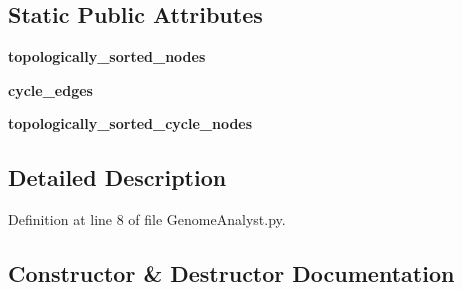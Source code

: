 \subsection*{Static Public Attributes}
\begin{DoxyCompactItemize}
\item 
{\bfseries topologically\+\_\+sorted\+\_\+nodes}\hypertarget{class_n_e_a_t___py_genetics_1_1_n_e_a_t_1_1_analyst_1_1_genome_analyst_1_1_genome_analyst_a61333814f998f2c80d271f3ebc92d198}{}\label{class_n_e_a_t___py_genetics_1_1_n_e_a_t_1_1_analyst_1_1_genome_analyst_1_1_genome_analyst_a61333814f998f2c80d271f3ebc92d198}

\item 
{\bfseries cycle\+\_\+edges}\hypertarget{class_n_e_a_t___py_genetics_1_1_n_e_a_t_1_1_analyst_1_1_genome_analyst_1_1_genome_analyst_a5453383e771c7f655739ee80508a8b08}{}\label{class_n_e_a_t___py_genetics_1_1_n_e_a_t_1_1_analyst_1_1_genome_analyst_1_1_genome_analyst_a5453383e771c7f655739ee80508a8b08}

\item 
{\bfseries topologically\+\_\+sorted\+\_\+cycle\+\_\+nodes}\hypertarget{class_n_e_a_t___py_genetics_1_1_n_e_a_t_1_1_analyst_1_1_genome_analyst_1_1_genome_analyst_adee62c855c0445f8b5c4032ceaf1217d}{}\label{class_n_e_a_t___py_genetics_1_1_n_e_a_t_1_1_analyst_1_1_genome_analyst_1_1_genome_analyst_adee62c855c0445f8b5c4032ceaf1217d}

\end{DoxyCompactItemize}


\subsection{Detailed Description}


Definition at line 8 of file Genome\+Analyst.\+py.



\subsection{Constructor \& Destructor Documentation}
